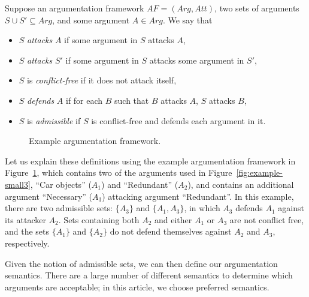 \begin{definition} Suppose an argumentation framework $AF=(Arg,Att)$, two sets of arguments $S\cup S'\subseteq Arg$, and some argument $A\in Arg$. We say that
\begin{itemize}
\item $S$ \emph{attacks} $A$ if some argument in $S$ attacks $A$,
\item $S$ \emph{attacks} $S'$ if some argument in $S$ attacks some argument in $S'$,
\item $S$ is \emph{conflict-free} if it does not attack itself,
\item $S$ \emph{defends} $A$ if for each $B$ such that $B$ attacks $A$, $S$ attacks $B$,
\item $S$ is \emph{admissible} if $S$ is conflict-free and defends each argument in it.
\end{itemize}
\end{definition}

\begin{figure}[ht!]
\centering
{}
\caption{Example argumentation framework.}
\label{fig:goalmodeling:arg2}
\end{figure}

Let us explain these definitions using the example argumentation framework in Figure~\ref{fig:goalmodeling:arg2}, which contains two of the arguments used in Figure~\ref{fig:example-small3}, ``Car objects'' ($A_1$) and ``Redundant'' ($A_2$), and contains an additional argument ``Necessary'' ($A_3$) attacking argument ``Redundant''. In this example, there are two admissible sets: $\{A_3\}$ and $\{A_1, A_3\}$, in which $A_3$ defends $A_1$ against its attacker $A_2$. Sets containing both $A_2$ and either $A_1$ or $A_3$ are not conflict free, and the sets $\{A_1\}$ and $\{A_2\}$ do not defend themselves against $A_2$ and $A_3$, respectively. 

Given the notion of admissible sets, we can then define our argumentation semantics. There are a large number of different semantics to determine which arguments are acceptable; in this article, we choose preferred semantics.

